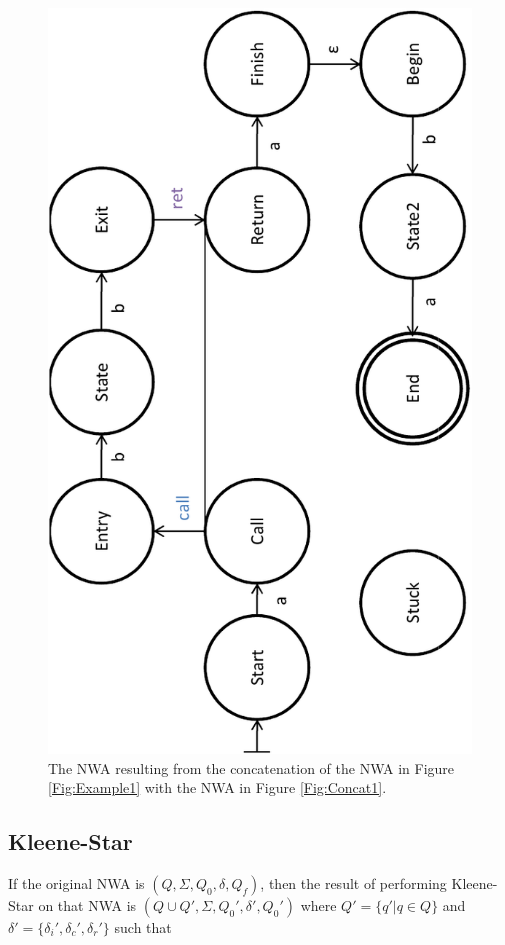 \begin{figure}[p]
  \centering
    \includegraphics[width=12cm]{Figures/Figure10}
  \caption{The NWA resulting from the concatenation of the NWA in Figure
    \ref{Fig:Example1} with the NWA in Figure \ref{Fig:Concat1}.}
  \label{Fig:Concat2}
\end{figure}


\subsection{Kleene-Star}
\label{Se:Star}

If the original NWA is $(Q, \Sigma, Q_0, \delta, Q_f)$,
then the result of performing Kleene-Star on that NWA is $(Q \cup Q', \Sigma,
Q_0', \delta', Q_0')$ where $Q' = \{q' | q \in Q\}$ and $\delta' =
\{\delta_i',\delta_c',\delta_r'\}$ such that

